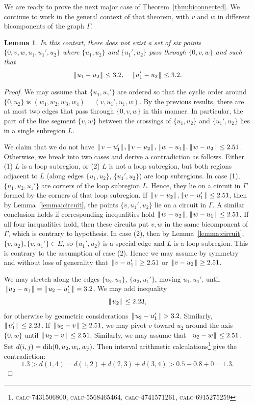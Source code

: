 \documentclass[11pt]{amsart}
\def\op#1{{\text{#1}}}
\def\text{\hbox}
\def\|{{\hskip0.1em|\hskip-0.15em|\hskip0.1em}}
\def\calc#1{{\textsc{calc-#1}}}
\newtheorem{lemma}{Lemma}
\begin{document}
We are ready to prove the next major case of Theorem~\ref{thm:biconnected}.
We continue to work in the general context of that theorem, with $v$ and $w$
in different bicomponents of the graph $\Gamma$.

\begin{lemma}\label{lemma:double-cross}  
In this context, there does not exist a set of six points $\{0,v,w,u_1,u_1',u_2\}$
where $\{u_1,u_2\}$ and $\{u_1',u_2\}$ pass through $\{0,v,w\}$ and such that
  $$\|u_1-u_2\|\le 3.2,\quad \|u_1'-u_2\|\le 3.2.$$
\end{lemma}

\begin{proof}  We may assume that $\{u_1,u_1'\}$ are ordered so that the cyclic order around $\{0,u_2\}$ is
$(w_1,w_2,w_3,w_4)=(v,u_1',u_1,w)$. 
By the previous results, there are at most two edges that pass through $\{0,v,w\}$
in this manner.  In particular, the part of the line segment $\{v,w\}$ between the crossings
of $\{u_1,u_2\}$ and $\{u_1',u_2\}$ lies in a single subregion $L$.  

We claim that we do not have $\|v-u_1'\|,\|v-u_2\|,\|w-u_1\|,\|w-u_2\|\le 2.51$.  Otherwise, we break
into two cases and derive a contradiction as follows.  Either (1) $L$ is a loop subregion, or (2)
$L$ is not a loop subregion, but both regions adjacent to $L$ (along edges $\{u_1,u_2\}$, $\{u_1',u_2\}$)
are loop subregions.  In case (1),
$\{u_1,u_2,u_1'\}$ are corners of the loop subregion $L$.  Hence, they lie on a circuit in $\Gamma$
formed by the corners of that loop subregion.  
If $\|v-u_2\|,\|v-u_1'\|\le 2.51$, then by Lemma~\ref{lemma:circuit}, the points
$\{v,u_1',u_2\}$ lie on a circuit in $\Gamma$.  A similar conclusion holds if corresponding inequalities
hold $\|w-u_2\|,\|w-u_1\|\le 2.51$.  If all four inequalities hold, then these circuits put $v,w$ in the
same bicomponent of $\Gamma$, which is contrary to hypothesis.  
In case (2), then by Lemma~\ref{lemma:circuit}, $\{v,u_2\},\{v,u_1'\}\in E$, so $\{u_1',u_2\}$ is a special
edge and $L$ is a loop subregion.  This is contrary to the assumption of case (2).
Hence we may assume by symmetry and without
loss of generality that $\|v-u_1'\|\ge 2.51$ or $\|v-u_2\|\ge 2.51$.

We may stretch along the edges $\{u_2,u_1\}$, $\{u_2,u_1'\}$, moving $u_1,u_1'$, 
until $\|u_2-u_1\|=\|u_2-u_1'\|=3.2$.   We may add inequality
$$
\|u_2\|\le 2.23,
$$
for otherwise by geometric considerations $\|u_2-u_1'\|> 3.2$.  Similarly, $\|u_1'\|\le 2.23$.
If $\|u_2-v\|\ge 2.51$, we may pivot $v$ toward $u_2$ around the axis $\{0,w\}$ until $\|u_2-v\|\le 2.51$.
Similarly, we may assume that $\|u_2-w\|\le 2.51$.
Set $d(i,j) = \op{dih}(0,u_2,w_i,w_j)$.
Then interval arithmetic calculations\footnote{\calc{7431506800}, \calc{5568465464}, \calc{4741571261}, \calc{6915275259} } give the contradiction:
$$
1.3 > d(1,4) = d(1,2) +d(2,3)+d (3,4) > 0.5 + 0.8 + 0 = 1.3.
$$
\end{proof}
\end{document}
